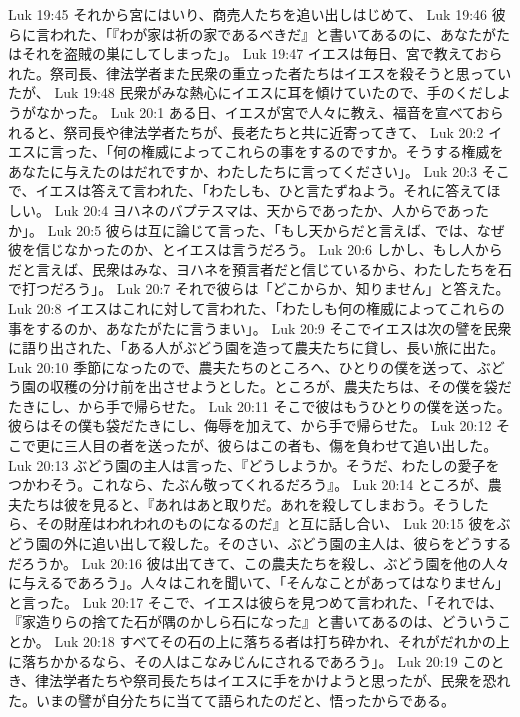 Luk 19:45  それから宮にはいり、商売人たちを追い出しはじめて、
Luk 19:46  彼らに言われた、「『わが家は祈の家であるべきだ』と書いてあるのに、あなたがたはそれを盗賊の巣にしてしまった」。
Luk 19:47  イエスは毎日、宮で教えておられた。祭司長、律法学者また民衆の重立った者たちはイエスを殺そうと思っていたが、
Luk 19:48  民衆がみな熱心にイエスに耳を傾けていたので、手のくだしようがなかった。
Luk 20:1  ある日、イエスが宮で人々に教え、福音を宣べておられると、祭司長や律法学者たちが、長老たちと共に近寄ってきて、
Luk 20:2  イエスに言った、「何の権威によってこれらの事をするのですか。そうする権威をあなたに与えたのはだれですか、わたしたちに言ってください」。
Luk 20:3  そこで、イエスは答えて言われた、「わたしも、ひと言たずねよう。それに答えてほしい。
Luk 20:4  ヨハネのバプテスマは、天からであったか、人からであったか」。
Luk 20:5  彼らは互に論じて言った、「もし天からだと言えば、では、なぜ彼を信じなかったのか、とイエスは言うだろう。
Luk 20:6  しかし、もし人からだと言えば、民衆はみな、ヨハネを預言者だと信じているから、わたしたちを石で打つだろう」。
Luk 20:7  それで彼らは「どこからか、知りません」と答えた。
Luk 20:8  イエスはこれに対して言われた、「わたしも何の権威によってこれらの事をするのか、あなたがたに言うまい」。
Luk 20:9  そこでイエスは次の譬を民衆に語り出された、「ある人がぶどう園を造って農夫たちに貸し、長い旅に出た。
Luk 20:10  季節になったので、農夫たちのところへ、ひとりの僕を送って、ぶどう園の収穫の分け前を出させようとした。ところが、農夫たちは、その僕を袋だたきにし、から手で帰らせた。
Luk 20:11  そこで彼はもうひとりの僕を送った。彼らはその僕も袋だたきにし、侮辱を加えて、から手で帰らせた。
Luk 20:12  そこで更に三人目の者を送ったが、彼らはこの者も、傷を負わせて追い出した。
Luk 20:13  ぶどう園の主人は言った、『どうしようか。そうだ、わたしの愛子をつかわそう。これなら、たぶん敬ってくれるだろう』。
Luk 20:14  ところが、農夫たちは彼を見ると、『あれはあと取りだ。あれを殺してしまおう。そうしたら、その財産はわれわれのものになるのだ』と互に話し合い、
Luk 20:15  彼をぶどう園の外に追い出して殺した。そのさい、ぶどう園の主人は、彼らをどうするだろうか。
Luk 20:16  彼は出てきて、この農夫たちを殺し、ぶどう園を他の人々に与えるであろう」。人々はこれを聞いて、「そんなことがあってはなりません」と言った。
Luk 20:17  そこで、イエスは彼らを見つめて言われた、「それでは、『家造りらの捨てた石が隅のかしら石になった』と書いてあるのは、どういうことか。
Luk 20:18  すべてその石の上に落ちる者は打ち砕かれ、それがだれかの上に落ちかかるなら、その人はこなみじんにされるであろう」。
Luk 20:19  このとき、律法学者たちや祭司長たちはイエスに手をかけようと思ったが、民衆を恐れた。いまの譬が自分たちに当てて語られたのだと、悟ったからである。
